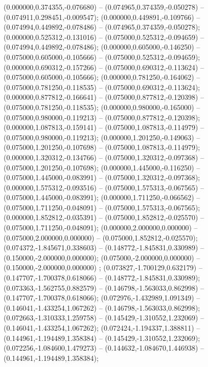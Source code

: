 (0.000000,0.374355,-0.076680) -- (0.074965,0.374359,-0.050278) -- (0.074911,0.298451,-0.009547);
 (0.000000,0.449891,-0.109766) -- (0.074994,0.449892,-0.078486) -- (0.074965,0.374359,-0.050278);
 (0.000000,0.525312,-0.131016) -- (0.075000,0.525312,-0.094659) -- (0.074994,0.449892,-0.078486);
 (0.000000,0.605000,-0.146250) -- (0.075000,0.605000,-0.105666) -- (0.075000,0.525312,-0.094659);
 (0.000000,0.690312,-0.157266) -- (0.075000,0.690312,-0.113624) -- (0.075000,0.605000,-0.105666);
 (0.000000,0.781250,-0.164062) -- (0.075000,0.781250,-0.118535) -- (0.075000,0.690312,-0.113624);
 (0.000000,0.877812,-0.166641) -- (0.075000,0.877812,-0.120398) -- (0.075000,0.781250,-0.118535);
 (0.000000,0.980000,-0.165000) -- (0.075000,0.980000,-0.119213) -- (0.075000,0.877812,-0.120398);
 (0.000000,1.087813,-0.159141) -- (0.075000,1.087813,-0.114979) -- (0.075000,0.980000,-0.119213);
 (0.000000,1.201250,-0.149063) -- (0.075000,1.201250,-0.107698) -- (0.075000,1.087813,-0.114979);
 (0.000000,1.320312,-0.134766) -- (0.075000,1.320312,-0.097368) -- (0.075000,1.201250,-0.107698);
 (0.000000,1.445000,-0.116250) -- (0.075000,1.445000,-0.083991) -- (0.075000,1.320312,-0.097368);
 (0.000000,1.575312,-0.093516) -- (0.075000,1.575313,-0.067565) -- (0.075000,1.445000,-0.083991);
 (0.000000,1.711250,-0.066562) -- (0.075000,1.711250,-0.048091) -- (0.075000,1.575313,-0.067565);
 (0.000000,1.852812,-0.035391) -- (0.075000,1.852812,-0.025570) -- (0.075000,1.711250,-0.048091);
 (0.000000,2.000000,0.000000) -- (0.075000,2.000000,0.000000) -- (0.075000,1.852812,-0.025570);
 (0.074372,-1.845671,0.338603) -- (0.148772,-1.845831,0.330989) -- (0.150000,-2.000000,0.000000);
 (0.075000,-2.000000,0.000000) -- (0.150000,-2.000000,0.000000) ;
 (0.073827,-1.700129,0.632179) -- (0.147707,-1.700378,0.618066) -- (0.148772,-1.845831,0.330989);
 (0.073363,-1.562755,0.882579) -- (0.146798,-1.563033,0.862998) -- (0.147707,-1.700378,0.618066);
 (0.072976,-1.432989,1.091349) -- (0.146041,-1.433254,1.067262) -- (0.146798,-1.563033,0.862998);
 (0.072663,-1.310333,1.259758) -- (0.145429,-1.310552,1.232069) -- (0.146041,-1.433254,1.067262);
 (0.072424,-1.194337,1.388811) -- (0.144961,-1.194489,1.358384) -- (0.145429,-1.310552,1.232069);
 (0.072256,-1.084600,1.479273) -- (0.144632,-1.084670,1.446938) -- (0.144961,-1.194489,1.358384);
